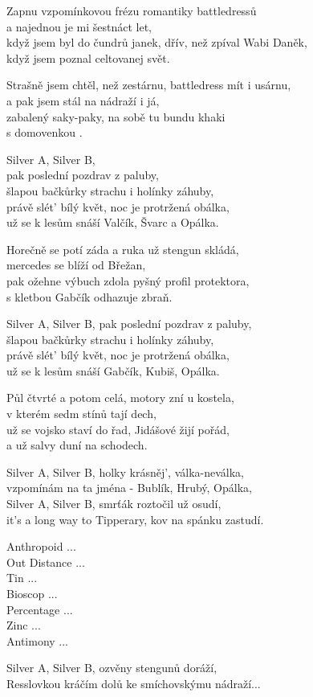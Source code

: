 
\ve{}
Zapnu vzpomínkovou frézu romantiky battledressů \\
a najednou je mi šestnáct let, \\
když jsem byl do čundrů janek, dřív, než zpíval Wabi Daněk, \\
když jsem poznal celtovanej svět. 

\ve{}
Strašně jsem chtěl, než zestárnu, battledress mít i usárnu, \\
a pak jsem stál na nádraží i já, \\
zabalený saky-paky, na sobě tu bundu khaki \\
s domovenkou . 

\cho{}
Silver A, Silver B, \\
pak poslední pozdrav z paluby, \\
šlapou bačkůrky strachu i holínky záhuby, \\
právě slét' bílý květ, noc je protržená obálka, \\
už se k lesům snáší Valčík, Švarc a Opálka. 

\ve{}
Horečně se potí záda a ruka už stengun skládá, \\
mercedes se blíží od Břežan, \\
pak ožehne výbuch zdola pyšný profil protektora, \\
s kletbou Gabčík odhazuje zbraň. 

\cho{}
Silver A, Silver B, pak poslední pozdrav z paluby, \\
šlapou bačkůrky strachu i holínky záhuby, \\
právě slét' bílý květ, noc je protržená obálka, \\
už se k lesům snáší Gabčík, Kubiš, Opálka. 

\ve{}
Půl čtvrté a potom celá, motory zní u kostela, \\
v kterém sedm stínů tají dech, \\
už se vojsko staví do řad, Jidášové žijí pořád, \\
a už salvy duní na schodech. 

\cho{}
Silver A, Silver B, holky krásněj', válka-neválka, \\
vzpomínám na ta jména - Bublík, Hrubý, Opálka, \\
Silver A, Silver B, smrťák roztočil už osudí, \\
it's a long way to Tipperary, kov na spánku zastudí. 

Anthropoid ... \\
Out Distance ... \\
Tin ... \\
Bioscop ... \\
Percentage ... \\
Zinc ... \\
Antimony ... 

\cho{}
Silver A, Silver B, ozvěny stengunů doráží, \\
Resslovkou kráčím dolů ke smíchovskýmu nádraží... 

\esong